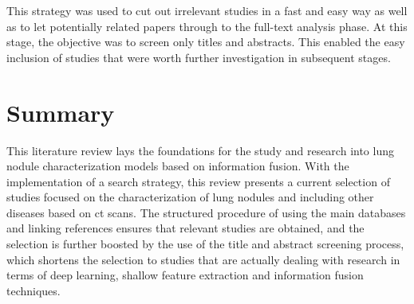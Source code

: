 This strategy was used to cut out irrelevant studies in a fast and easy way as well as to let potentially related papers through to the full-text analysis phase. At this stage, the objective was to screen only titles and abstracts. This enabled the easy inclusion of studies that were worth further investigation in subsequent stages.

\newpage
\section{Summary}

This literature review lays the foundations for the study and research into lung nodule characterization models based on information fusion. With the implementation of a search strategy, this review presents a current selection of studies focused on the characterization of lung nodules and including other diseases based on \ac{ct} scans. The structured procedure of using the main databases and linking references ensures that relevant studies are obtained, and the selection is further boosted by the use of the title and abstract screening process, which shortens the selection to studies that are actually dealing with research in terms of deep learning, shallow feature extraction and information fusion techniques.
